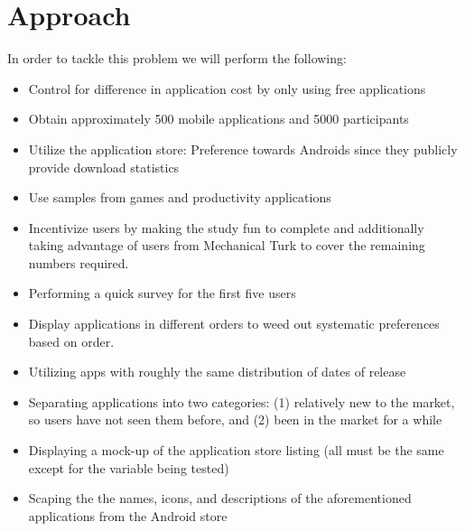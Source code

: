 \section{Approach}

In order to tackle this problem we will perform the following:

\begin{itemize}
\item Control for difference in application cost by only using free applications
\item Obtain approximately 500 mobile applications and 5000 participants 
\item Utilize the application store: Preference towards Androids since they publicly provide download statistics
\item Use samples from games and productivity applications
\item Incentivize users by making the study fun to complete and additionally taking advantage of users from Mechanical Turk to cover the remaining numbers required.
\item Performing a quick survey for the first five users
\item Display applications in different orders to weed out systematic preferences based on order.
\item Utilizing apps with roughly the same distribution of dates of release
\item Separating applications into two categories: (1) relatively new to the market, so users have not seen them before, and (2) been in the market for a while
\item Displaying a mock-up of the application store listing (all must be the same except for the variable being tested)
\item Scaping the the names, icons, and descriptions of the aforementioned applications from the Android store
\end{itemize}